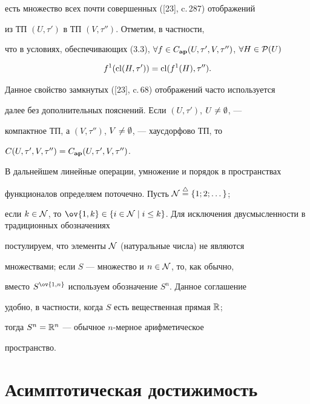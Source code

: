 есть множество всех почти совершенных ([23], c.\,287) отображений


из ТП $(U,{{\tau}'})$ в ТП $(V,{{\tau}''})$. Отметим, в частности,


что в условиях, обеспечивающих (3.3), $\fo{f} \in


{C_{{\bold a}{\bold p}}}(U,{{\tau}'},V,{{\tau}''})$, $\fo{H} \in


{{\cal P}(U)}$


$$


{f^1}({\cl}(H,{{\tau}'})) = {\cl}({f^1}(H),{{\tau}''}).


$$


Данное свойство замкнутых ([23], c.\,68) отображений часто используется


далее без дополнительных пояснений. Если $(U,{{\tau}'})$, $U\ne \emptyset$, ---


компактное ТП, а $(V,{{\tau}''})$, $V \ne \emptyset$, --- хаусдорфово ТП, то


$C(U,{{\tau}'},V,{{\tau}''}) =


{C_{{\bold a}{\bold p}}}(U,{{\tau}'},V,{{\tau}''})$.





В дальнейшем линейные операции, умножение и порядок в пространствах


функционалов определяем поточечно. Пусть ${\cal N} \overset{\triangle}{=}{} \{1;2;\dotsc\}$;


если $k \in {\cal N}$, то $\ov{1,k} \in \{i \in {\cal N} \mid


i \le k\}$. Для исключения двусмысленности в традиционных обозначениях


постулируем, что элементы ${\cal N}$ (натуральные числа) не являются


множествами; если $S$ --- множество и $n \in {\cal N}$, то, как обычно,


вместо $S^{\ov{1,n}}$ используем обозначение $S^n$. Данное соглашение


удобно, в частности, когда $S$ есть вещественная прямая ${\Bbb R}$;


тогда ${S^n} = {{\Bbb R}^n}$ --- обычное $n$-мерное арифметическое


пространство.





\section{Асимптотическая достижимость}





